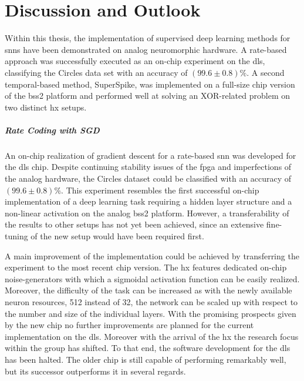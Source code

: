 \vspace{-1cm}
\chapter{Discussion and Outlook}
\label{discussionandoutlook}
\vspace{-0.5cm}
Within this thesis, the implementation of supervised deep learning methods for \glspl{snn} have been demonstrated on analog neuromorphic hardware. A rate-based approach was successfully executed as an on-chip experiment on the \gls{dls}, classifying the Circles data set with an accuracy of $(99.6 \pm 0.8) \%$. A second temporal-based method, SuperSpike, was implemented on a full-size chip version of the \gls{bss2} platform and performed well at solving an XOR-related problem on two distinct \gls{hx} setups.

\paragraph{Rate Coding with SGD} An on-chip realization of gradient descent for a rate-based \gls{snn} was developed for the \gls{dls} chip. Despite continuing stability issues of the \gls{fpga} and imperfections of the analog hardware, the Circles dataset could be classified with an accuracy of $(99.6 \pm 0.8) \%$. This experiment resembles the first successful on-chip implementation of a deep learning task requiring a hidden layer structure and a non-linear activation on the analog \gls{bss2} platform. However, a transferability of the results to other setups has not yet been achieved, since an extensive fine-tuning of the new setup would have been required first.

A main improvement of the implementation could be achieved by transferring the experiment to the most recent chip version. The \gls{hx} features dedicated on-chip noise-generators with which a sigmoidal activation function can be easily realized. Moreover, the difficulty of the task can be increased as with the newly available neuron resources, 512 instead of 32, the network can be scaled up with respect to the number and size of the individual layers. With the promising prospects given by the new chip no further improvements are planned for the current implementation on the \gls{dls}. Moreover with the arrival of the \gls{hx} the research focus within the group has shifted. To that end, the software development for the \gls{dls} has been halted. The older chip is still capable of performing remarkably well, but its successor outperforms it in several regards.

